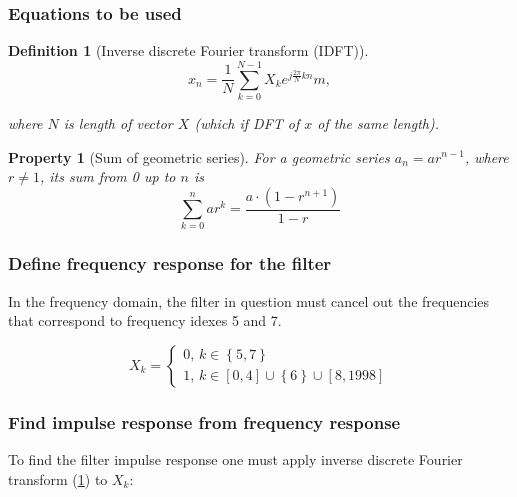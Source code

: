 \documentclass[a4paper]{article}
\theoremstyle{break}
\newtheorem{definition}{Definition}[section]
\theoremstyle{break}
\newtheorem{property}{Property}[section]
\begin{document}
\subsubsection*{Equations to be used}

\begin{definition}[Inverse discrete Fourier transform (IDFT)] \label{def:idft}
  \begin{equation} \label{eq:idft}
    x_n = \frac{1}{N} \sum_{k=0}^{N - 1} X_k e^{j \frac{2 \pi }{N} k n}m,
  \end{equation}

  where $N$ is length of vector $X$ (which if DFT of $x$ of the same length).
\end{definition}

\begin{property}[Sum of geometric series]
  For a geometric series $a_{n} = a r^{n - 1}$, where $r \neq 1$, its sum from 0 up to $n$ is
  \begin{equation} \label{eq:geom_sum}
    \sum_{k=0}^{n} a r^{k} = \frac{a \cdot \left( 1 - r^{n + 1} \right)}{1 - r}
  \end{equation}
\end{property}

\subsubsection*{Define frequency response for the filter}

In the frequency domain, the filter in question must cancel out the frequencies that correspond to frequency idexes 5 and 7.

\begin{equation*}
  X_k = \begin{cases}
          0, \, k \in \left\{ 5, 7 \right\} \\
          1, \, k \in [0, 4] \cup \left\{ 6 \right\} \cup [8, 1998]
        \end{cases}
\end{equation*}

\subsubsection*{Find impulse response from frequency response}

To find the filter impulse response one must apply inverse discrete Fourier transform (\ref{def:idft}) to $X_k$:
\end{document}
